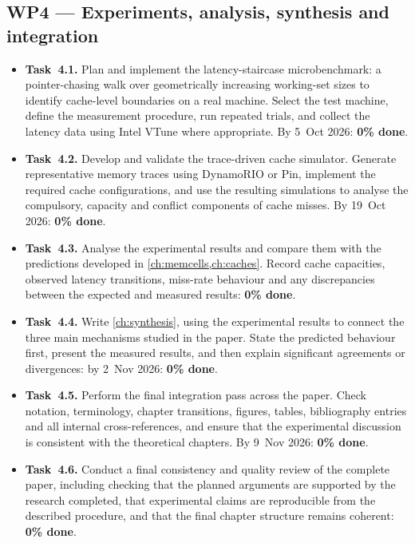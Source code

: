 \documentclass[11pt,a4paper]{report}
\begin{document}
\subsection*{WP4 --- Experiments, analysis, synthesis and integration}
\begin{itemize}[leftmargin=*]
  \item \textbf{Task~4.1.} Plan and implement the latency-staircase
    microbenchmark: a pointer-chasing walk over geometrically
    increasing working-set sizes to identify cache-level boundaries on
    a real machine. Select the test machine, define the measurement
    procedure, run repeated trials, and collect the latency data using
    Intel VTune where appropriate. By 5~Oct 2026: \textbf{0\% done}.

  \item \textbf{Task~4.2.} Develop and validate the trace-driven cache
    simulator. Generate representative memory traces using DynamoRIO
    or Pin, implement the required cache configurations, and use the
    resulting simulations to analyse the compulsory, capacity and
    conflict components of cache misses. By 19~Oct 2026:
    \textbf{0\% done}.

  \item \textbf{Task~4.3.} Analyse the experimental results and compare
    them with the predictions developed in \cref{ch:memcells,ch:caches}.
    Record cache capacities, observed latency transitions, miss-rate
    behaviour and any discrepancies between the expected and measured
    results: \textbf{0\% done}.

  \item \textbf{Task~4.4.} Write \cref{ch:synthesis}, using the
    experimental results to connect the three main mechanisms studied
    in the paper. State the predicted behaviour first, present the
    measured results, and then explain significant agreements or
    divergences: by 2~Nov 2026: \textbf{0\% done}.

  \item \textbf{Task~4.5.} Perform the final integration pass across
    the paper. Check notation, terminology, chapter transitions,
    figures, tables, bibliography entries and all internal
    cross-references, and ensure that the experimental discussion is
    consistent with the theoretical chapters. By 9~Nov 2026:
    \textbf{0\% done}.

  \item \textbf{Task~4.6.} Conduct a final consistency and quality
    review of the complete paper, including checking that the planned
    arguments are supported by the research completed, that
    experimental claims are reproducible from the described procedure,
    and that the final chapter structure remains coherent:
    \textbf{0\% done}.
\end{itemize}
\end{document}
